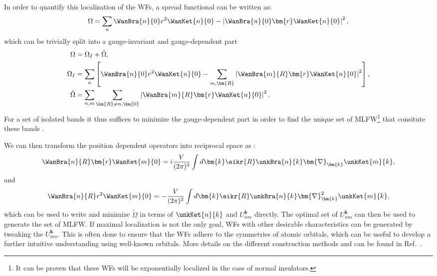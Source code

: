 In order to quantify this localization of the \glspl{WF}, a spread functional can be written as:
\begin{equation}
	\label{eq:Theory_spread}
	\Omega =\sum_n \WanBra{n}{0}r^2\WanKet{n}{0} - \left|\WanBra{n}{0}\bm{r}\WanKet{n}{0}\right|^2,
\end{equation}
which can be trivially split into a gauge-invariant and gauge-dependent part
\begin{align}
	\Omega &= \Omega_I + \tilde\Omega,  \\
	\Omega_I &= \sum_n \left[\WanBra{n}{0} r^2 \WanKet{n}{0} - \sum_{m,\bm{R}} \left| \WanBra{m}{R} \bm{r} \WanKet{n}{0}\right|^2\right] \label{eq:Theory_omegaI},\\
	\tilde\Omega &= \sum_{n,m} \sum_{\bm{R} \neq n,\bm{0}} \left|\WanBra{m}{R} \bm{r} \WanKet{n}{0}\right|^2.
\end{align}
For a set of isolated bands it thus suffices to minimize the gauge-dependent part in order to find the  unique set of \gls{MLFW}\footnote{It can be proven that these \glspl{WF} will be exponentially localized in the case of normal insulators.} that consitute these bands \cite{Kunes2004, Marzari2012}.

We can then transform the position dependent operators into reciprocal space as \cite{Blount1962}:
\begin{equation}
\WanBra{n}{R}\bm{r}\WanKet{m}{0} = i \frac{V}{(2\pi)^3}\int d\bm{k} \eikr{R}\unkBra{n}{k} \bm{\nabla}_{\bm{k}} \unkKet{m}{k},
\end{equation}
and
\begin{equation}
\WanBra{n}{R}r^2\WanKet{m}{0} = -\frac{V}{(2\pi)^3}\int d\bm{k} \eikr{R}\unkBra{n}{k} \bm{\nabla}_{\bm{k}}^2 \unkKet{m}{k},
\end{equation}
which can be used to write and minimize $\tilde\Omega$ in terms of $\unkKet{n}{k}$ and $U_{nm}^{\bm{k}}$ directly.
The optimal set of $U_{nm}^{\bm{k}}$ can then be used to generate the set of \gls{MLFW}.
If maximal localization is not the only goal, \glspl{WF} with other desirable characteristics can be generated by tweaking the $U_{nm}^{\bm{k}}$.
This is often done to ensure that the \glspl{WF} adhere to the symmetries of atomic orbitals, which can be useful to develop a further intuitive understanding using well-known orbitals.
More details on the different construction methods and can be found in Ref.~\cite{Marzari2012}.

